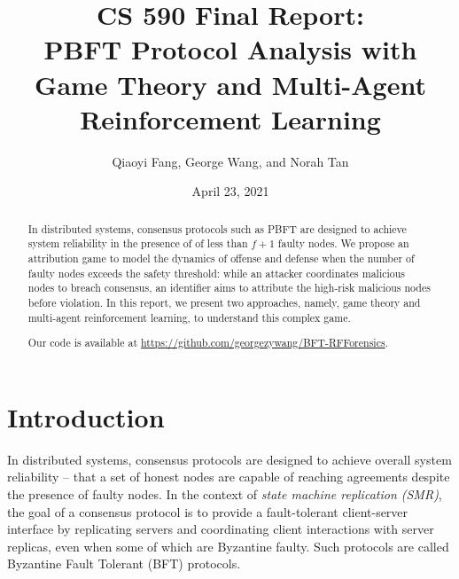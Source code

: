 \documentclass[a4paper,11pt]{article}
\title{CS 590 Final Report: \\ PBFT Protocol Analysis with Game Theory and Multi-Agent Reinforcement Learning}
\author{Qiaoyi Fang, George Wang, and Norah Tan}
\date{April 23, 2021}
\begin{document}
\maketitle

\begin{abstract}
In distributed systems, consensus protocols such as PBFT are designed to achieve system reliability in the presence of of less than $f+1$ faulty nodes. We propose an attribution game to model the dynamics of offense and defense when the number of faulty nodes exceeds the safety threshold: while an attacker coordinates malicious nodes to breach consensus, an identifier aims to attribute the high-risk malicious nodes before violation. In this report, we present two approaches, namely, game theory and multi-agent reinforcement learning, to understand this complex game.
    
Our code is available at \href{https://github.com/georgezywang/BFT-RFForensics}{https://github.com/georgezywang/BFT-RFForensics}.
    

\end{abstract}

\tableofcontents

\section{Introduction}\label{sec:intro}


In distributed systems, consensus protocols are designed to achieve overall system reliability -- that a set of honest nodes are capable of reaching agreements despite the presence of faulty nodes. In the context of \emph{state machine replication (SMR)}, the goal of a consensus protocol is to provide a fault-tolerant client-server interface by replicating servers and coordinating client interactions with server replicas, even when some of which are Byzantine faulty. Such protocols are called Byzantine Fault Tolerant (BFT) protocols.
\end{document}
